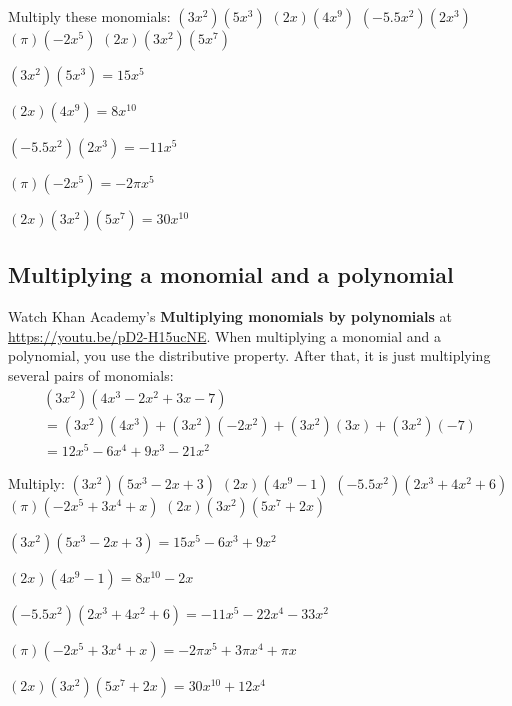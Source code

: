 \begin{Exercise}[title={Multiplying monomials}, label=multmonomials]
Multiply these monomials:
  \Question $(3x^2)(5x^3)$
\vspace{20mm}
  \Question $(2x)(4x^9)$
\vspace{20mm}
  \Question $(-5.5x^2)(2x^3)$
\vspace{20mm}
  \Question $(\pi)(-2x^5)$
\vspace{20mm}
  \Question $(2x)(3x^2)(5x^7)$
\vspace{20mm}
\end{Exercise}
\begin{Answer}[ref=multmonomials]
  $(3x^2)(5x^3) = 15x^5$
  
  $(2x)(4x^9) = 8x^{10}$
  
  $(-5.5x^2)(2x^3) = -11x^5$

  $(\pi)(-2x^5) = -2\pi x^5$
  
  $(2x)(3x^2)(5x^7) = 30x^{10}$
\end{Answer}

\subsection{Multiplying a monomial and a polynomial}

Watch Khan Academy's \textbf{Multiplying monomials by polynomials} at \url{https://youtu.be/pD2-H15ucNE}.
When multiplying a monomial and a polynomial, you use the distributive property. After that, it is just multiplying several pairs of monomials:
\begin{multline*}
  (3x^2)(4x^3 - 2x^2 + 3x - 7) \\
  = (3x^2)(4x^3) + (3x^2)(-2x^2) + (3x^2)(3x) + (3x^2)(-7) \\
  = 12x^5 - 6x^4 + 9x^3 -21x^2
\end{multline*}

\begin{Exercise}[title={Multiplying a monomial and a polynomial}, label=multmonopoly]
Multiply:
\Question $(3x^2)(5x^3 - 2x + 3)$
\vspace{20mm}
\Question $(2x)(4x^9 - 1)$
\vspace{20mm}
\Question $(-5.5x^2)(2x^3 + 4x^2 + 6)$
\vspace{20mm}
\Question $(\pi)(-2x^5 + 3x^4 + x)$
\vspace{20mm}
\Question $(2x)(3x^2)(5x^7 + 2x)$
\end{Exercise}
\begin{Answer}[ref=multmonopoly]
  $(3x^2)(5x^3 - 2x + 3) = 15x^5 - 6x^3 + 9x^2$

  $(2x)(4x^9 - 1) = 8x^{10} - 2x$

  $(-5.5x^2)(2x^3 + 4x^2 + 6) = -11x^5 - 22x^4 - 33x^2$

  $(\pi)(-2x^5 + 3x^4 + x) = -2\pi x^5 + 3\pi x^4 + \pi x$

  $(2x)(3x^2)(5x^7 + 2x) = 30x^{10} + 12x^4$
\end{Answer}


